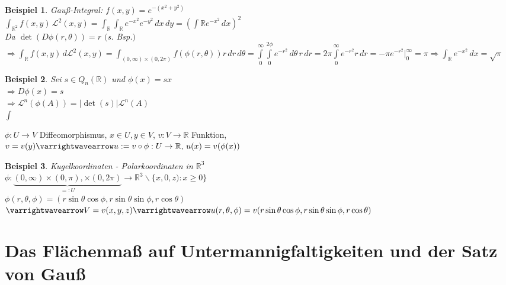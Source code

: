\documentclass[11pt]{memoir}
\theoremstyle{changebreak}
\newtheorem{Beispiel}{Beispiel}[chapter]
\begin{document}
\begin{Beispiel}
\emph{Gauß-Integral}:
$f(x, y) = e^{-(x^2 + y^2)}$ \\
$\int_{\mathbb R^2} f(x, y) \, \mathscr L^2(x, y) = \int_\mathbb R \int_\mathbb R e^{-x^2} e^{-y^2} \, dx\, dy = \left(\int \mathbb R e^{-x^2} \, dx \right)^2$ \\
Da $\det(D\phi(r, \theta)) = r$ $($s. Bsp.$)$ \\
$\Rightarrow \int_\mathbb R f(x, y) \, d\mathscr L^2(x,y) = \int_{(0, \infty) \times (0, 2\pi)} f(\phi(r, \theta))r \, dr\, d\theta = \int\limits_0^\infty \int\limits_0^{2\phi} e^{-r^2} \, d\theta\, r \, dr = 2\pi \int\limits_0^\infty e^{-r^2}r\, dr = -\pi e^{-r^2} |_0^\infty = \pi \Rightarrow \int_\mathbb R e^{-x^2} \, dx = \sqrt{\pi}$
\end{Beispiel}

\begin{Beispiel}
Sei $s \in Q_n(\mathbb R)$ und $\phi(x) = sx$ \\
$\Rightarrow D\phi(x) = s$ \\
$\Rightarrow \mathscr L^n(\phi(A)) = |\det(s)|\mathscr L^n(A)$ \\
$\int $
\end{Beispiel}


$\phi: U \rightarrow V$ Diffeomorphismus, $x \in U, y \in V$, $v: V \rightarrow \mathbb R$ Funktion, \\
$v = v(y) \varrightwavearrow u:= v \circ \phi: U \rightarrow \mathbb R, \, u(x) = v(\phi(x))$

\begin{Beispiel}
\emph{Kugelkoordinaten - Polarkoordinaten in $\mathbb R^3$} \\
$\phi: \underbrace{(0, \infty) \times (0, \pi), \times (0, 2\pi)}_{=: U} \rightarrow \mathbb R^3 \backslash \{x, 0, z): x \geq 0\}$ \\
$\phi(r, \theta, \phi) = (r \sin\theta\cos\phi, r\sin\theta\sin\phi, r\cos\theta)$ \\
$\varrightwavearrow V = v(x, y, z) \varrightwavearrow u(r, \theta, \phi) = v(r\sin\theta\cos\phi, r\sin\theta\sin\phi, r\cos\theta)$
\end{Beispiel}


\chapter{Das Flächenmaß auf Untermannigfaltigkeiten und der Satz von Gauß}
\end{document}
